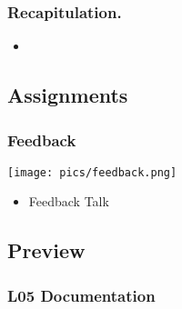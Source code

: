 \begin{frame}
	\frametitle{Recapitulation.}
	\begin{itemize}
		\item 
	\end{itemize}
\end{frame}

\subsection{Assignments}

\begin{frame}
	\frametitle{Feedback}

	\hfill \texttt{[image: pics/feedback.png]}
	\vspace{-1cm}
	\begin{itemize}
		\item Feedback Talk
	\end{itemize}
\end{frame}

\subsection{Preview}

\begin{frame}
	\frametitle{L05 Documentation}
\end{frame}



